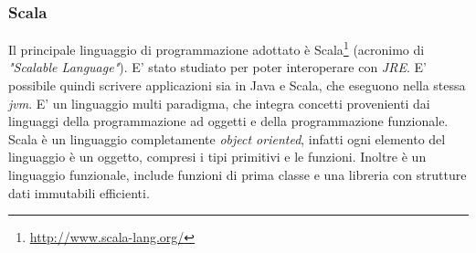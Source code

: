 \subsubsection{Scala}
Il principale linguaggio di programmazione adottato è Scala\footnote{\url{http://www.scala-lang.org/}} (acronimo di \emph{"Scalable Language"}). E' stato studiato per poter interoperare con \emph{JRE}. E' possibile quindi scrivere applicazioni sia in Java e Scala, che eseguono nella stessa \emph{\gls{jvm}}. E' un linguaggio multi paradigma, che integra concetti provenienti dai linguaggi della programmazione ad oggetti e della programmazione funzionale. Scala è un linguaggio completamente \emph{object oriented}, infatti ogni elemento del linguaggio è un oggetto, compresi i tipi primitivi e le funzioni. Inoltre è un linguaggio funzionale, include funzioni di prima classe e una libreria con strutture dati immutabili efficienti.
